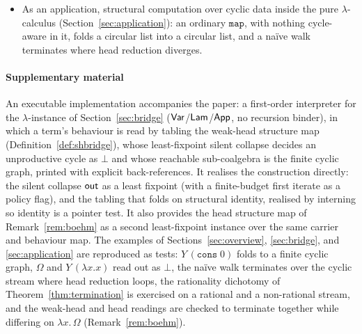 \begin{itemize}
    $\lambda$-calculus are the instance $M = \Delaym$ (pure divergence) and $F$ the
    $\lambda$-shape signature. There $\outm$ is the weak-head shape relation, $\Omega$ reads out
    as $\bot$, and a guarded cyclic term reads out as a finite cyclic graph. Deterministic
    reduction strategies in general are the case $M = \Delaym$ (Remark~\ref{rem:determinism}).
  \item As an application, structural computation over cyclic data inside the pure
    $\lambda$-calculus (Section~\ref{sec:application}): an ordinary $\mathtt{map}$, with nothing
    cycle-aware in it, folds a circular list into a circular list, and a na\"ive walk terminates
    where head reduction diverges.
\end{itemize}

\paragraph{Supplementary material}
An executable implementation accompanies the paper: a first-order interpreter for the
$\lambda$-instance of Section~\ref{sec:bridge} ($\mathsf{Var}$/$\mathsf{Lam}$/$\mathsf{App}$, no recursion binder), in
which a term's behaviour is read by tabling the weak-head structure map (Definition~\ref{def:shbridge}),
whose least-fixpoint silent collapse decides an unproductive cycle as $\bot$ and whose reachable
sub-coalgebra is the finite cyclic graph, printed with explicit back-references. It realises the construction
directly: the silent collapse $\outm$ as a least fixpoint (with a finite-budget first iterate as a
policy flag), and the tabling that folds on structural identity, realised by interning so identity is
a pointer test. It also provides the head structure map of Remark~\ref{rem:boehm} as a second
least-fixpoint instance over the same carrier and behaviour map. The examples of
Sections~\ref{sec:overview}, \ref{sec:bridge}, and \ref{sec:application} are reproduced as tests:
$Y\,(\mathtt{cons}\;0)$ folds to a finite cyclic graph, $\Omega$ and $Y\,(\lambda x.x)$ read out as
$\bot$, the na\"ive walk terminates over the cyclic stream where head reduction loops, the
rationality dichotomy of Theorem~\ref{thm:termination} is exercised on a rational and a non-rational
stream, and the weak-head and head readings are checked to terminate together while differing on
$\lambda x.\,\Omega$ (Remark~\ref{rem:boehm}).

